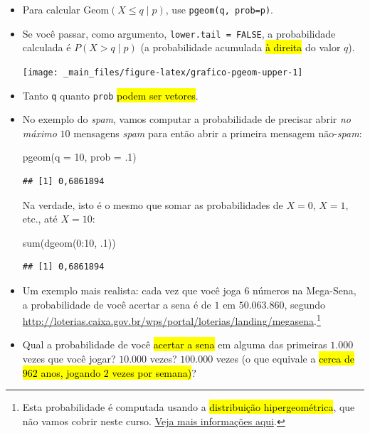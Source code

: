 \documentclass[
  11pt]{report}
\newenvironment{Shaded}{\begin{snugshade}}{\end{snugshade}}
\newcommand{\AttributeTok}[1]{\textcolor[rgb]{0.77,0.63,0.00}{#1}}
\newcommand{\DecValTok}[1]{\textcolor[rgb]{0.00,0.00,0.81}{#1}}
\newcommand{\FunctionTok}[1]{\textcolor[rgb]{0.00,0.00,0.00}{#1}}
\newcommand{\NormalTok}[1]{#1}
\newcommand{\SpecialCharTok}[1]{\textcolor[rgb]{0.00,0.00,0.00}{#1}}
\renewenvironment{Shaded}{
    \begin{mdframed}[%
      roundcorner=2pt,%
      innerleftmargin=5pt,%
      innerrightmargin=5pt,%
      topline=true,%
      leftline=true,%
      rightline=true,%
      bottomline=true,%
      linewidth=0.5pt,%
      linecolor=black!20,%
      backgroundcolor=black!2,%
      skipabove=2ex,%
      skipbelow=2.5ex%
    ]%
  }
  {
    \end{mdframed}
  }
\begin{document}
\begin{itemize}
\item
  Para calcular $\text{Geom}(X \leq q \mid p)$, use \texttt{pgeom(q,\ prob=p)}.
\item
  Se você passar, como argumento, \texttt{lower.tail\ =\ FALSE}, a probabilidade calculada é $P(X > q \mid p)$ (a probabilidade acumulada {\hl{à direita}} do valor $q$).

  \begin{center}\texttt{[image: \_main\_files/figure-latex/grafico-pgeom-upper-1]} \end{center}
\item
  Tanto \texttt{q} quanto \texttt{prob} {\hl{podem ser vetores}}.
\item
  No exemplo do \emph{spam}, vamos computar a probabilidade de precisar abrir \emph{no máximo} $10$ mensagens \emph{spam} para então abrir a primeira mensagem não-\emph{spam}:

\begin{Shaded}
\begin{Highlighting}[]
\FunctionTok{pgeom}\NormalTok{(}\AttributeTok{q =} \DecValTok{10}\NormalTok{, }\AttributeTok{prob =}\NormalTok{ .}\DecValTok{1}\NormalTok{)}
\end{Highlighting}
\end{Shaded}

\begin{verbatim}
## [1] 0,6861894
\end{verbatim}

  Na verdade, isto é o mesmo que somar as probabilidades de $X = 0$, $X = 1$, etc., até $X = 10$:

\begin{Shaded}
\begin{Highlighting}[]
\FunctionTok{sum}\NormalTok{(}\FunctionTok{dgeom}\NormalTok{(}\DecValTok{0}\SpecialCharTok{:}\DecValTok{10}\NormalTok{, .}\DecValTok{1}\NormalTok{))}
\end{Highlighting}
\end{Shaded}

\begin{verbatim}
## [1] 0,6861894
\end{verbatim}
\item
  Um exemplo mais realista: cada vez que você joga $6$ números na Mega-Sena, a probabilidade de você acertar a sena é de $1$ em $50.063.860$, segundo \url{http://loterias.caixa.gov.br/wps/portal/loterias/landing/megasena}.\footnote{Esta probabilidade é computada usando a {\hl{distribuição hipergeométrica}}, que não vamos cobrir neste curso. \href{https://pt.wikipedia.org/wiki/Distribui\%C3\%A7\%C3\%A3o_hipergeom\%C3\%A9trica}{Veja mais informações aqui}.}
\item
  Qual a probabilidade de você {\hl{acertar a sena}} em alguma das primeiras $1.000$ vezes que você jogar? $10.000$ vezes? $100.000$ vezes (o que equivale a {\hl{cerca de $962$ anos, jogando $2$ vezes por semana)}}?


\end{itemize}
\end{document}
